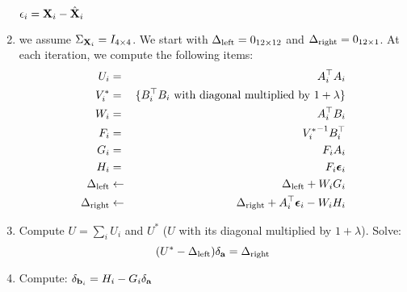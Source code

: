 \begin{enumerate}
$\mathbf{\epsilon}_i=\mathbf{X}_i-\hat{\mathbf{X}}_i$
 \item we assume $\Sigma_{\mathbf{X}_i}={I_{4 \times 4}}$. We start with $\Delta_\text{left}={0_{12 \times 12}}$ and $\Delta_\text{right}={0_{12 \times 1}}$. At each iteration, we compute the following items:
 \begin{eqnarray*}
  U_i &= & A_i^\top A_i \\
  V_i^* &= &\{B_i^\top B_i \text{ with diagonal multiplied by } 1+\lambda \}\\
  W_i &= &A_i^\top B_i \\
  F_i &= &{V_i^*}^{-1} B_i^\top \\
  G_i &= &F_i A_i \\
  H_i &= &F_i \bm{\epsilon}_i \\
  \Delta_\text{left} &\leftarrow &\Delta_\text{left} + W_i G_i \\
  \Delta_\text{right} &\leftarrow &\Delta_\text{right} + A_i^\top \bm{\epsilon}_i -W_i H_i
 \end{eqnarray*}
\item Compute $U=\sum_i U_i$ and $U^*$ ($U$ with its diagonal multiplied by  $1+\lambda$). Solve: $$( U^* - \Delta_\text{left} ) \delta_{\mathbf{a}} =\Delta_\text{right}$$

\item Compute: $\delta_{\mathbf{b}_i}=H_i-G_i \delta_{\mathbf{a}}$
\end{enumerate}



